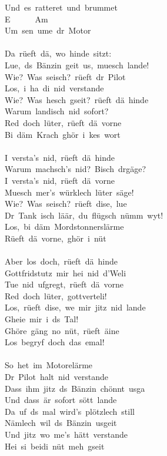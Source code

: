 \documentclass[]{book}
\begin{document}
Und~es~ratteret~und~brummet\\
\hspace*{0.333em}\hspace*{0.333em}\hspace*{0.333em}\hspace*{0.333em}\hspace*{0.333em}\hspace*{0.333em}\hspace*{0.333em}E~~~~~~Am\\
Um~sen~ume~dr~Motor\\
~\\
Da~rüeft~dä,~wo~hinde~sitzt:\\
Lue,~ds~Bänzin~geit~us,~muesch~lande!\\
Wie?~Was~seisch?~rüeft~dr~Pilot\\
Los,~i~ha~di~nid~verstande\\
Wie?~Was~hesch~gseit?~rüeft~dä~hinde\\
Warum~landisch~nid~sofort?\\
Red~doch~lüter,~rüeft~dä~vorne\\
Bi~däm~Krach~ghör~i~kes~wort\\
~\\
I~versta's~nid,~rüeft~dä~hinde\\
Warum~machsch's~nid?~Bisch~drgäge?\\
I~versta's~nid,~rüeft~dä~vorne\\
Muesch~mer's~würklech~lüter~säge!\\
Wie?~Was~seisch?~rüeft~dise,~lue\\
Dr~Tank~isch~läär,~du~flügsch~nümm~wyt!\\
Los,~bi~däm~Mordstonnerslärme\\
Rüeft~dä~vorne,~ghör~i~nüt\\
~\\
Aber~los~doch,~rüeft~dä~hinde\\
Gottfridstutz~mir~hei~nid~d'Weli\\
Tue~nid~ufgregt,~rüeft~dä~vorne\\
Red~doch~lüter,~gottverteli!\\
Los,~rüeft~dise,~we~mir~jitz~nid~lande\\
Gheie~mir~i~ds~Tal!\\
Ghöre~gäng~no~nüt,~rüeft~äine\\
Los~begryf~doch~das~emal!\\
~\\
So~het~im~Motorelärme\\
Dr~Pilot~halt~nid~verstande\\
Dass~ihm~jitz~ds~Bänzin~chönnt~usga\\
Und~dass~är~sofort~sött~lande\\
Da~uf~ds~mal~wird's~plötzlech~still\\
Nämlech~wil~ds~Bänzin~usgeit\\
Und~jitz~wo~me's~hätt~verstande\\
Hei~si~beidi~nüt~meh~gseit~\\
~\\
~\\
\end{document}
